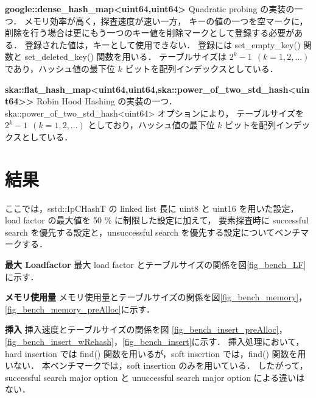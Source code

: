 %
{\bf google::dense\_hash\_map<uint64,uint64>}
\samepage\newline\indent
Quadratic probing の実装の一つ．
メモリ効率が高く，探査速度が速い一方，
キーの値の一つを空マークに，削除を行う場合は更にもう一つのキー値を削除マークとして登録する必要がある．
登録された値は，キーとして使用できない．
登録には set\_empty\_key() 関数と set\_deleted\_key() 関数を用いる．
テーブルサイズは $2^k-1\ \ (k=1,2,...)$ であり，ハッシュ値の最下位 $k$ ビットを配列インデックスとしている．
\leavevmode \newline

%
{\bf ska::flat\_hash\_map<uint64,uint64,ska::power\_of\_two\_std\_hash<uint64>>}
\samepage\newline\indent
Robin Hood Hashing の実装の一つ．
ska::power\_of\_two\_std\_hash<uint64> オプションにより，
テーブルサイズを $2^k-1\ \ (k=1,2,...)$ としており，ハッシュ値の最下位 $k$ ビットを配列インデックスとしている．
\leavevmode \newline


\section{結果}
ここでは，sstd::IpCHashT の linked list 長に uint8 と uint16 を用いた設定，load factor の最大値を 50 \% に制限した設定に加えて，
要素探査時に successful search を優先する設定と，unsuccessful search を優先する設定についてベンチマークする．
\leavevmode \newline

%
{\bf 最大 Loadfactor}
\samepage\newline\indent
最大 load factor とテーブルサイズの関係を図\ref{fig_bench_LF}に示す．
\leavevmode \newline

%
{\bf メモリ使用量}
\samepage\newline\indent
メモリ使用量とテーブルサイズの関係を図\ref{fig_bench_memory}，\ref{fig_bench_memory_preAlloc}に示す．
\leavevmode \newline

%
{\bf 挿入}
\samepage\newline\indent
挿入速度とテーブルサイズの関係を図
\ref{fig_bench_insert_preAlloc}，\ref{fig_bench_insert_wRehash}，\ref{fig_bench_insert}に示す．
挿入処理において，hard insertion では find() 関数を用いるが，soft insertion では，find() 関数を用いない．
本ベンチマークでは，soft insertion のみを用いている．
したがって，successful search major option と unuccessful search major option による違いはない．
\leavevmode \newline

